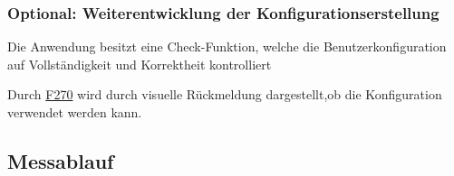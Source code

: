 \documentclass[parskip=full]{scrartcl}
\begin{document}
\subsubsection{Optional: Weiterentwicklung der Konfigurationserstellung}

\begin{description}

\hypertarget{link-f270}{\item[(opt.) F270]} Die Anwendung besitzt eine Check-Funktion, welche die \gls{Benutzerkonfiguration} auf Vollständigkeit und Korrektheit kontrolliert
\hypertarget{link-f280}{\item[(opt.) F280]} Durch \hyperlink{link-f270}{F270} wird durch visuelle Rückmeldung dargestellt,ob die Konfiguration verwendet werden kann.

\end{description}

\subsection{Messablauf}
\end{document}
